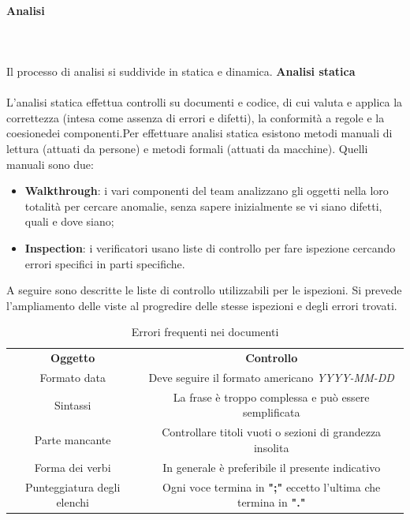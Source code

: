 		\paragraph{Analisi} \mbox{}\\ \mbox{}\\
		Il processo di analisi si suddivide in statica e dinamica. \newline \newline
			\textbf{Analisi statica} \mbox{}\\ \mbox{}\\
			L'analisi statica effettua controlli su documenti e codice, di cui valuta e applica la correttezza (intesa come assenza di errori e difetti), la conformità a regole e la coesione\glosp dei componenti.\newline Per effettuare analisi statica esistono metodi manuali di lettura (attuati da persone) e metodi formali (attuati da macchine). Quelli manuali sono due:
			\begin{itemize}
				\item \textbf{Walkthrough}: i vari componenti del team analizzano gli oggetti nella loro totalità per cercare anomalie, senza sapere inizialmente se vi siano difetti, quali e dove siano;
				\item \textbf{Inspection}: i verificatori usano liste di controllo per fare ispezione cercando errori specifici in parti specifiche.
			\end{itemize}
			A seguire sono descritte le liste di controllo utilizzabili per le ispezioni. Si prevede l'ampliamento delle viste al progredire delle stesse ispezioni e degli errori trovati.
			\begin{table}[H]
				\centering\renewcommand{\arraystretch}{1.5}
				\caption{Errori frequenti nei documenti}
				\begin{tabular}{c|c}
					
					\rowcolorhead
					{ \textbf{Oggetto}} &
					{ \textbf{Controllo} }\\
					
					\rowcolorlight
					{\colorbody Formato data} & { Deve seguire il formato americano \textit{YYYY-MM-DD}} 
					\\
					
					\rowcolordark
					{\colorbody Sintassi} & {  La frase è troppo complessa e può essere semplificata } 
					\\	
					
					\rowcolorlight
					{\colorbody Parte mancante} & { Controllare titoli vuoti o sezioni di grandezza insolita} 
					\\
					
					\rowcolordark
					{\colorbody Forma dei verbi} & { In generale è preferibile il presente indicativo} 
					\\
					
					\rowcolorlight
					{ Punteggiatura degli elenchi} & { Ogni voce termina in \textbf{";"} eccetto l'ultima che termina in \textbf{"."}} 
					\\
				\end{tabular}
			\end{table}

